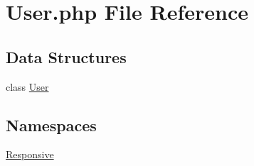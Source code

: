 \hypertarget{_user_8php}{}\section{User.\+php File Reference}
\label{_user_8php}
\subsection*{Data Structures}
\begin{DoxyCompactItemize}
\item 
class \mbox{\hyperlink{class_responsive_1_1_user}{User}}
\end{DoxyCompactItemize}
\subsection*{Namespaces}
\begin{DoxyCompactItemize}
\item 
 \mbox{\hyperlink{namespace_responsive}{Responsive}}
\end{DoxyCompactItemize}
